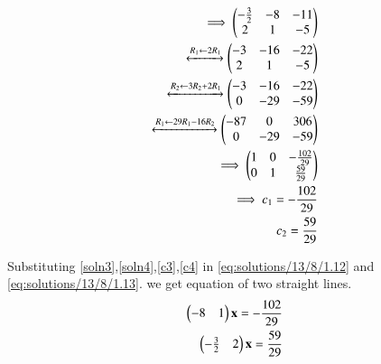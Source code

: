 \begin{align}
    \implies\begin{pmatrix}-\frac{3}{2} & -8 & -11\\2 & 1 & -5\end{pmatrix}\\
    \xleftrightarrow[]{R_1\leftarrow 2R_1}\begin{pmatrix}-3 & -16 & -22\\2 & 1 & -5\end{pmatrix}\\
    \xleftrightarrow[]{R_2\leftarrow 3R_2+2R_1}\begin{pmatrix}-3 & -16 & -22\\0 & -29 & -59\end{pmatrix}\\
    \xleftrightarrow[]{R_1\leftarrow 29R_1-16R_2}\begin{pmatrix}-87 & 0 & 306\\0 & -29 & -59\end{pmatrix}\\
    \implies\begin{pmatrix}1 & 0 & -\frac{102}{29}\\0 & 1 & \frac{59}{29}\end{pmatrix}\\
    \implies c_1=-\frac{102}{29}\label{c3}\\
    c_2=\frac{59}{29}\label{c4}
\end{align}

Substituting \eqref{soln3},\eqref{soln4},\eqref{c3},\eqref{c4} in \eqref{eq:solutions/13/8/1.12} and \eqref{eq:solutions/13/8/1.13}. we get equation of two straight lines.
\begin{align}
    \begin{pmatrix}-8 & 1\end{pmatrix}\mathbf{x}=-\frac{102}{29}\\
    \begin{pmatrix}-\frac{3}{2} & 2\end{pmatrix}\mathbf{x}=\frac{59}{29}
\end{align}
